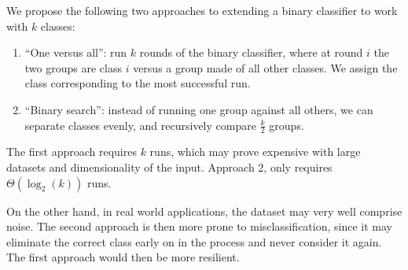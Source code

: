 We propose the following two approaches to extending a binary classifier to work with $k$ classes:

\begin{enumerate}
  \item ``One versus all'': run $k$ rounds of the binary classifier, where at round $i$ the two groups are class $i$ versus a group made of all other classes. We assign the class corresponding to the most successful run.
  \item ``Binary search'': instead of running one group against all others, we can separate classes evenly, and recursively compare $\frac{k}{2}$ groups.
\end{enumerate}

The first approach requires $k$ runs, which may prove expensive with large datasets and dimensionality of the input. Approach 2, only requires $\Theta(\log_2(k))$ runs.

On the other hand, in real world applications, the dataset may very well comprise noise. The second approach is then more prone to misclassification, since it may eliminate the correct class early on in the process and never consider it again. The first approach would then be more resilient.
